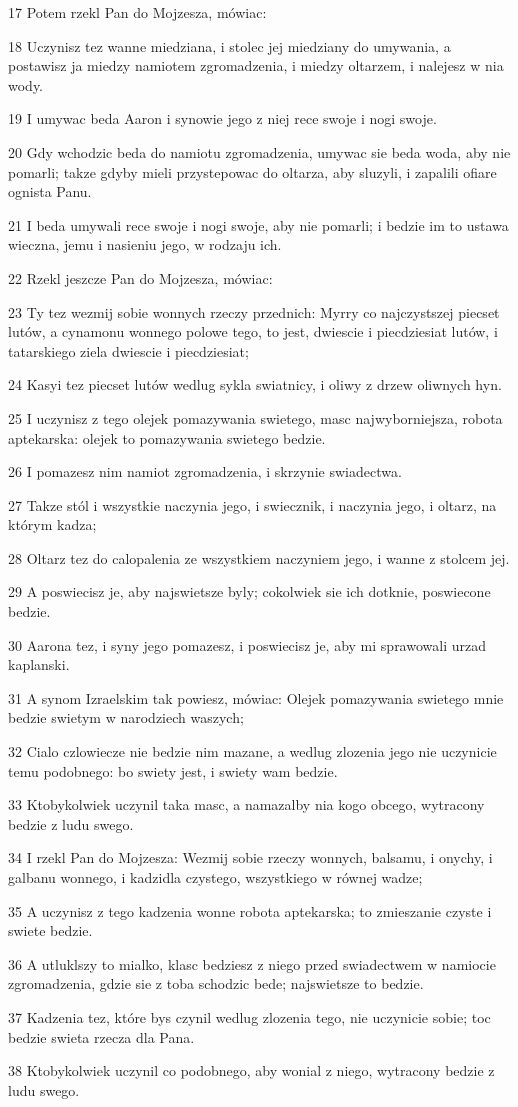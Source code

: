 \par 17 Potem rzekl Pan do Mojzesza, mówiac:
\par 18 Uczynisz tez wanne miedziana, i stolec jej miedziany do umywania, a postawisz ja miedzy namiotem zgromadzenia, i miedzy oltarzem, i nalejesz w nia wody.
\par 19 I umywac beda Aaron i synowie jego z niej rece swoje i nogi swoje.
\par 20 Gdy wchodzic beda do namiotu zgromadzenia, umywac sie beda woda, aby nie pomarli; takze gdyby mieli przystepowac do oltarza, aby sluzyli, i zapalili ofiare ognista Panu.
\par 21 I beda umywali rece swoje i nogi swoje, aby nie pomarli; i bedzie im to ustawa wieczna, jemu i nasieniu jego, w rodzaju ich.
\par 22 Rzekl jeszcze Pan do Mojzesza, mówiac:
\par 23 Ty tez wezmij sobie wonnych rzeczy przednich: Myrry co najczystszej piecset lutów, a cynamonu wonnego polowe tego, to jest, dwiescie i piecdziesiat lutów, i tatarskiego ziela dwiescie i piecdziesiat;
\par 24 Kasyi tez piecset lutów wedlug sykla swiatnicy, i oliwy z drzew oliwnych hyn.
\par 25 I uczynisz z tego olejek pomazywania swietego, masc najwyborniejsza, robota aptekarska: olejek to pomazywania swietego bedzie.
\par 26 I pomazesz nim namiot zgromadzenia, i skrzynie swiadectwa.
\par 27 Takze stól i wszystkie naczynia jego, i swiecznik, i naczynia jego, i oltarz, na którym kadza;
\par 28 Oltarz tez do calopalenia ze wszystkiem naczyniem jego, i wanne z stolcem jej.
\par 29 A poswiecisz je, aby najswietsze byly; cokolwiek sie ich dotknie, poswiecone bedzie.
\par 30 Aarona tez, i syny jego pomazesz, i poswiecisz je, aby mi sprawowali urzad kaplanski.
\par 31 A synom Izraelskim tak powiesz, mówiac: Olejek pomazywania swietego mnie bedzie swietym w narodziech waszych;
\par 32 Cialo czlowiecze nie bedzie nim mazane, a wedlug zlozenia jego nie uczynicie temu podobnego: bo swiety jest, i swiety wam bedzie.
\par 33 Ktobykolwiek uczynil taka masc, a namazalby nia kogo obcego, wytracony bedzie z ludu swego.
\par 34 I rzekl Pan do Mojzesza: Wezmij sobie rzeczy wonnych, balsamu, i onychy, i galbanu wonnego, i kadzidla czystego, wszystkiego w równej wadze;
\par 35 A uczynisz z tego kadzenia wonne robota aptekarska; to zmieszanie czyste i swiete bedzie.
\par 36 A utluklszy to mialko, klasc bedziesz z niego przed swiadectwem w namiocie zgromadzenia, gdzie sie z toba schodzic bede; najswietsze to bedzie.
\par 37 Kadzenia tez, które bys czynil wedlug zlozenia tego, nie uczynicie sobie; toc bedzie swieta rzecza dla Pana.
\par 38 Ktobykolwiek uczynil co podobnego, aby wonial z niego, wytracony bedzie z ludu swego.

